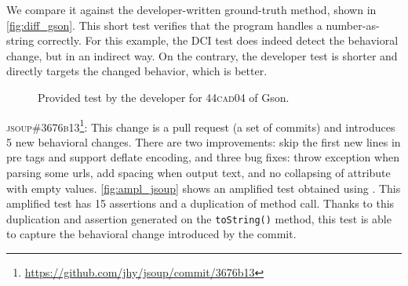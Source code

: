 We compare it against the developer-written ground-truth method, shown in \autoref{fig:diff_gson}. 
This short test verifies that the program handles a number-as-string correctly.
For this example, the DCI test does indeed detect the behavioral change, but in an indirect way.
On the contrary, the developer test is shorter and directly targets the changed behavior, which is better.

\begin{figure}[h]
\centering
{}
\caption{Provided test by the developer for \textsc{44cad04} of Gson.}
\label{fig:diff_gson}
\end{figure}



\textsc{jsoup\#3676b13}\footnote{\url{https://github.com/jhy/jsoup/commit/3676b13}}: This change is a pull request (\ie a set of commits) and introduces 5 new behavioral changes. There are two improvements: skip the first new lines in pre tags and support deflate encoding, and three bug fixes: throw exception when parsing some urls, add spacing when output text, and no collapsing of attribute with empty values.
\autoref{fig:ampl_jsoup} shows an amplified test obtained using \DCII.
This amplified test has 15 assertions and a duplication of method call.
Thanks to this duplication and assertion generated on the \texttt{toString()} method, this test is able to capture the behavioral change introduced by the commit.

